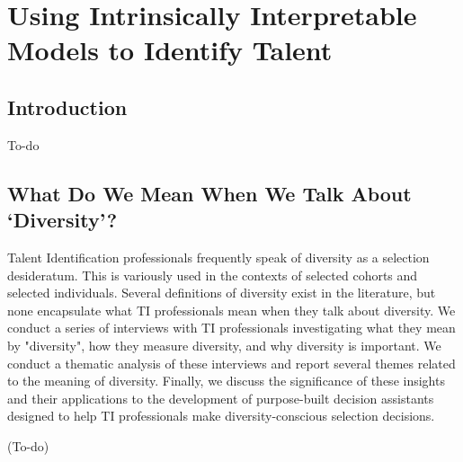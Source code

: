 

\chapter{\label{ch:5-iaicasestudy}Using Intrinsically Interpretable Models to Identify Talent} %

\minitoc

\section{Introduction}
To-do

\section{What Do We Mean When We Talk About `Diversity'?}
Talent Identification professionals frequently speak of diversity as a selection desideratum. This is variously used in the contexts of selected cohorts and selected individuals. Several definitions of diversity exist in the literature, but none encapsulate what TI professionals mean when they talk about diversity. We conduct a series of interviews with TI professionals investigating what they mean by "diversity", how they measure diversity, and why diversity is important. We conduct a thematic analysis of these interviews and report several themes related to the meaning of diversity. Finally, we discuss the significance of these insights and their applications to the development of purpose-built decision assistants designed to help TI professionals make diversity-conscious selection decisions.

(To-do)

